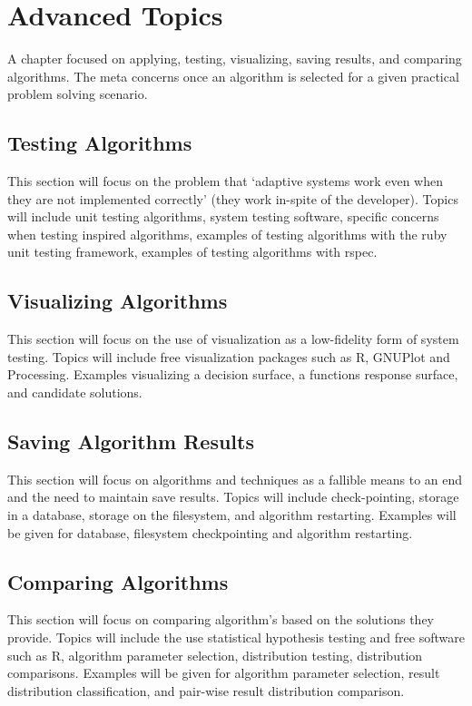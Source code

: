 \chapter{Advanced Topics}
\label{ch:advanced}
A chapter focused on applying, testing, visualizing, saving results, and comparing algorithms. The meta concerns once an algorithm is selected for a given practical problem solving scenario.

\section{Testing Algorithms}
This section will focus on the problem that `adaptive systems work even when they are not implemented correctly' (they work in-spite of the developer). Topics will include unit testing algorithms, system testing software, specific concerns when testing inspired algorithms, examples of testing algorithms with the ruby unit testing framework, examples of testing algorithms with rspec.

\section{Visualizing Algorithms}
This section will focus on the use of visualization as a low-fidelity form of system testing. Topics will include free visualization packages such as R, GNUPlot and Processing. Examples visualizing a decision surface, a functions response surface, and candidate solutions.

\section{Saving Algorithm Results}
This section will focus on algorithms and techniques as a fallible means to an end and the need to maintain save results. Topics will include check-pointing, storage in a database, storage on the filesystem, and algorithm restarting. Examples will be given for database, filesystem checkpointing and algorithm restarting.

\section{Comparing Algorithms}
This section will focus on comparing algorithm's based on the solutions they provide. Topics will include the use statistical hypothesis testing and free software such as R, algorithm parameter selection, distribution testing, distribution comparisons. Examples will be given for algorithm parameter selection, result distribution classification, and pair-wise result distribution comparison.